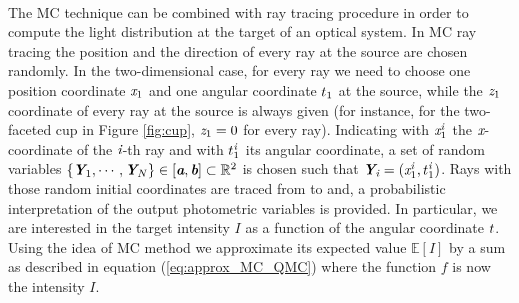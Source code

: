 \\ \indent The MC technique can be combined with ray tracing procedure in order to compute the light distribution at the target of an optical system.
In MC ray tracing the position and the direction of  every ray at the source are chosen randomly. 
In the two-dimensional case, for every ray we need to choose one position coordinate $\textit{x}_1$ and one angular coordinate $t_1$ at the source, while the $\textit{z}_1$ coordinate of every ray at the source is always given (for instance, for the two-faceted cup in Figure \ref{fig:cup}, $\textit{z}_1=0$ for every ray). 
Indicating with $\textit{x}_{1}^{\textit{i}}$ the $\textit{x}$-coordinate of the $\textit{i}$-th ray and with $t_1^{\textit{i}}$ its angular coordinate, a set of random variables $\{\textit{\textbf{Y}}_1, \cdots, \textit{\textbf{Y}}_N\}\in [\textit{\textbf{a}}, \textit{\textbf{b}}]\subset\mathbb{R}^2$ is chosen such that $\textit{\textbf{Y}}_{\textit{i}}= (\textit{x}_{1}^{\textit{i}},t_1^{\textit{i}})$.
Rays with those random initial coordinates are traced from  to  and, a probabilistic interpretation of the output photometric variables is provided.
In particular, we are interested in the target intensity $I$ as a function of the angular coordinate $t$. Using the idea of MC method we approximate its expected value $\mathbb{E}[I]$ by a sum as described in equation (\ref{eq:approx_MC_QMC}) where the function $f$ is now the intensity $I$.
